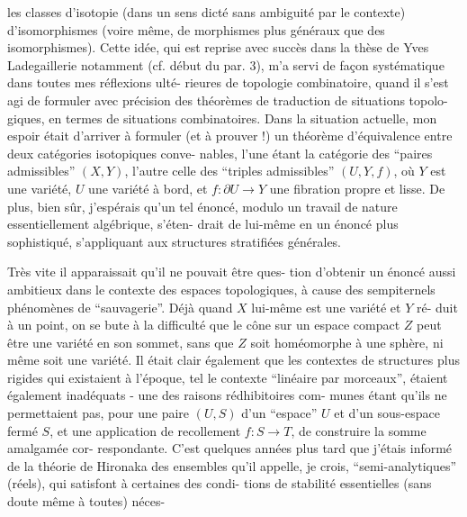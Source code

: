\documentclass[11pt]{article}
\newcommand{\scanpage}[1]{\par\bigskip\noindent{\small\sffamily[scan #1]}\par}
\newcommand{\mspage}[1]{{\small\sffamily[p.\,#1]}}
\begin{document}
\clearpage
\scanpage{119/106}
\mspage{28}

les classes d'isotopie (dans un sens dicté sans ambiguité par le
contexte) d'isomorphismes (voire même, de morphismes plus généraux
que des isomorphismes). Cette idée, qui est reprise avec succès
dans la thèse de Yves Ladegaillerie notamment (cf. début du par. 3),
m'a servi de façon systématique dans toutes mes réflexions ulté-%
rieures de topologie combinatoire, quand il s'est agi de formuler
avec précision des théorèmes de traduction de situations topolo-%
giques, en termes de situations combinatoires. Dans la situation
actuelle, mon espoir était d'arriver à formuler (et à prouver !)
un théorème d'équivalence entre deux catégories isotopiques conve-%
nables, l'une étant la catégorie des ``paires admissibles'' $(X,Y)$,
l'autre celle des ``triples admissibles'' $(U,Y,f)$, où $Y$ est une
variété, $U$ une variété à bord, et $f : \partial U \longrightarrow Y$ une fibration
propre et lisse. De plus, bien sûr, j'espérais qu'un tel énoncé,
modulo un travail de nature essentiellement algébrique, s'éten-%
drait de lui-même en un énoncé plus sophistiqué, s'appliquant aux
structures stratifiées générales.

Très vite il apparaissait qu'il ne pouvait être ques-%
tion d'obtenir un énoncé aussi ambitieux dans le contexte des
espaces topologiques, à cause des sempiternels phénomènes de
``sauvagerie''. Déjà quand $X$ lui-même est une variété et $Y$ ré-%
duit à un point, on se bute à la difficulté que le cône sur un
espace compact $Z$ peut être une variété en son sommet, sans que
$Z$ soit homéomorphe à une sphère, ni même soit une variété. Il
était clair également que les contextes de structures plus rigides
qui existaient à l'époque, tel le contexte ``linéaire par morceaux'',
étaient également inadéquats - une des raisons rédhibitoires com-%
munes étant qu'ils ne permettaient pas, pour une paire $(U,S)$
d'un ``espace'' $U$ et d'un sous-espace fermé $S$, et une application
de recollement $f : S \longrightarrow T$, de construire la somme amalgamée cor-%
respondante. C'est quelques années plus tard que j'étais informé
de la théorie de Hironaka des ensembles qu'il appelle, je crois,
``semi-analytiques'' (réels), qui satisfont à certaines des condi-%
tions de stabilité essentielles (sans doute même à toutes) néces-
\end{document}
